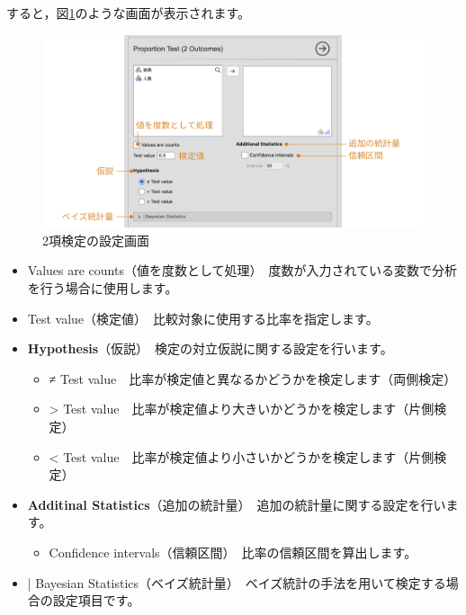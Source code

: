 \documentclass[
  12pt,
  a5jpaper,
  lualatex, ja=standard]{bxjsbook}
\providecommand{\tightlist}{%
  \setlength{\itemsep}{0pt}\setlength{\parskip}{0pt}}
\newenvironment{jmvsettings}{%
	\begin{center}%
	\begin{tcolorbox}[%
		title=設定項目,
		colframe=gmoji,
		colbacktitle=gmoji,
		colback=gmoji!2!white,
		breakable,
		width=.9\textwidth,
		]\small\addtolength{\leftmargini}{-3\labelsep}%
	}%
	{\end{tcolorbox}\end{center}}
\begin{document}
すると，図\ref{fig:frequencies-binomial-setting}のような画面が表示されます。

\begin{figure}[!ht]

{\centering \includegraphics[width=1\linewidth]{images/frequencies/binomial-setting} 

}

\caption{2項検定の設定画面}\label{fig:frequencies-binomial-setting}
\end{figure}

\begin{jmvsettings}

\begin{itemize}
\tightlist
\item
  Values are counts（値を度数として処理）　度数が入力されている変数で分析を行う場合に使用します。
\item
  Test value（検定値）　比較対象に使用する比率を指定します。
\item
  \textbf{Hypothesis}（仮説）　検定の対立仮説に関する設定を行います。

  \begin{itemize}
  \tightlist
  \item
    ≠ Test value　比率が検定値と異なるかどうかを検定します（両側検定）
  \item
    \textgreater{} Test value　比率が検定値より大きいかどうかを検定します（片側検定）
  \item
    \textless{} Test value　比率が検定値より小さいかどうかを検定します（片側検定）
  \end{itemize}
\item
  \textbf{Additinal Statistics}（追加の統計量）　追加の統計量に関する設定を行います。

  \begin{itemize}
  \tightlist
  \item
    Confidence intervals（信頼区間）　比率の信頼区間を算出します。
  \end{itemize}
\item
  \colorbox{bar}{\textcolor{gmoji2}{| Bayesian Statistics}}（ベイズ統計量）　ベイズ統計の手法を用いて検定する場合の設定項目です。
\end{itemize}

\end{jmvsettings}
\end{document}
